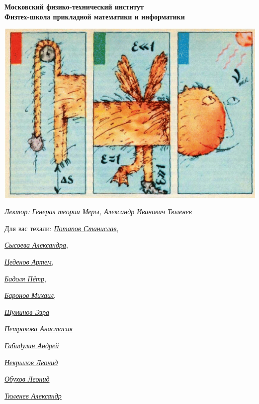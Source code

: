 \begin{titlepage}
	\clearpage\thispagestyle{empty}
	\centering
	
	\textbf{Московский физико-технический институт \\ Физтех-школа прикладной математики и информатики}
	\vspace{50pt}
    
    \noindent 
    \includegraphics[width=1.0\textwidth]{Pictures/title}
    \vspace{10pt}

 
 
     \textit{\large{Лектор: Генерал теории Меры, Александр Иванович Тюленев}
} 

	\vfill
	\begin{flushright}
    \noindent
    Для вас техали: \href{https://vk.com/invader17}{\textit{Потапов Станислав}}, 
  
    \href{https://vk.com/salexame}{\textit{ Сысоева Александра}}, 
    
    \href{https://vk.com/darkness11235}{\textit{ Цеденов Артем}},  
    
    \href{https://vk.com/akzium}{\textit{Бадоля Пётр}},
    
    \href{https://vk.com/id389655743}{\textit{Баронов Михаил}},

    \href{https://t.me/YamSuf}{\textit{Шуминов Эзра}}
    
    \href{https://vk.com/prizrakkota}{\textit{Петракова Анастасия}}
    
    \href{https://t.me/andreygabi}{\textit{Габидулин Андрей}}
    
    \href{https://t.me/leonid_n_n}{\textit{Некрылов Леонид}}

    \href{https://t.me/oleonids}{\textit{Обухов Леонид}}
    
    \href{https://t.me/alexander_math_123}{\textit{Тюленев Александр}}

    
  
	\end{flushright}


	\pagebreak
\end{titlepage}
